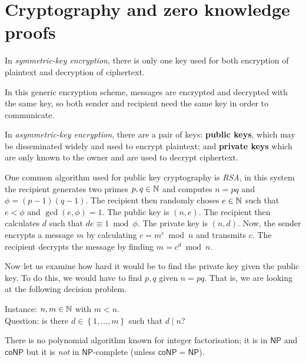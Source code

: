 
\section{Cryptography and zero knowledge proofs}

\begin{definition}
	In \emph{symmetric-key encryption}, there is only one key used for
	both encryption of plaintext and decryption of ciphertext.
\end{definition}

In this generic encryption scheme, messages are encrypted and decrypted
with the same key, so both sender and recipient need the same key in order
to communicate.

\begin{definition}
	In \emph{asymmetric-key encryption}, there are a pair of keys:
	\textbf{public keys}, which may be disseminated widely and used to
	encrypt plaintext; and \textbf{private keys} which are only known
	to the owner and are used to decrypt ciphertext.
\end{definition}

\begin{example}[RSA]
	One common algorithm used for public key cryptography is \emph{RSA},
	in this system the recipient generates two primes $p, q \in \mathbb{N}$
	and computes $n = pq$ and $\phi = (p-1)(q-1)$.
	The recipient then randomly choses $e \in \mathbb{N}$ such that
	$e < \phi$ and $\gcd(e, \phi) = 1$.
	The public key is $(n,e)$.
	The recipient then calculates $d$ such that
	$de \equiv 1 \bmod \phi$.
	The private key is $(n,d)$.
	Now, the sender encrypts a message $m$ by calculating $c = m^e \bmod n$
	and transmits $c$.
	The recipient decrypts the message by finding $m = c^d \bmod n$.
\end{example}

Now let us examine how hard it would be to find the private key given the public
key.
To do this, we would have to find $p,q$ given $n = pq$.
That is, we are looking at the following decision problem.

\begin{problem}
	Instance: $n, m \in \mathbb{N}$ with $m < n$. \\
	Question: is there $d \in \left\{
		1, \ldots, m
	\right\}$ such that $d \mid n$?
\end{problem}

There is no polynomial algorithm known for integer factorisation;
it is in $\mathsf{NP}$ and $\mathsf{coNP}$
but it is \emph{not} in $\mathsf{NP}$-complete
(unless $\mathsf{coNP} = \mathsf{NP}$).

